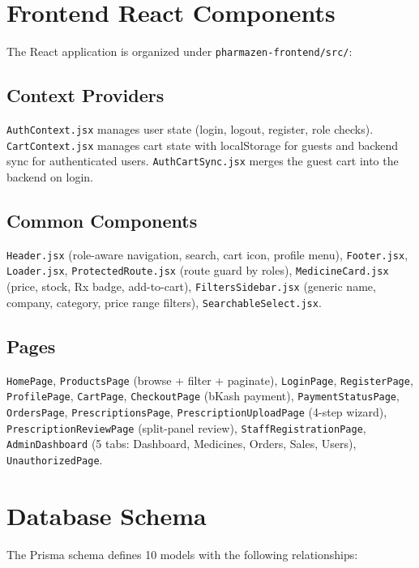 \documentclass[12pt,a4paper]{article}
\begin{document}
\section{Frontend React Components}
The React application is organized under \texttt{pharmazen-frontend/src/}:

\subsection{Context Providers}
\texttt{AuthContext.jsx} manages user state (login, logout, register, role checks). \texttt{CartContext.jsx} manages cart state with localStorage for guests and backend sync for authenticated users. \texttt{AuthCartSync.jsx} merges the guest cart into the backend on login.

\subsection{Common Components}
\texttt{Header.jsx} (role-aware navigation, search, cart icon, profile menu), \texttt{Footer.jsx}, \texttt{Loader.jsx}, \texttt{ProtectedRoute.jsx} (route guard by roles), \texttt{MedicineCard.jsx} (price, stock, Rx badge, add-to-cart), \texttt{FiltersSidebar.jsx} (generic name, company, category, price range filters), \texttt{SearchableSelect.jsx}.

\subsection{Pages}
\texttt{HomePage}, \texttt{ProductsPage} (browse + filter + paginate), \texttt{LoginPage}, \texttt{RegisterPage}, \texttt{ProfilePage}, \texttt{CartPage}, \texttt{CheckoutPage} (bKash payment), \texttt{PaymentStatusPage}, \texttt{OrdersPage}, \texttt{PrescriptionsPage}, \texttt{PrescriptionUploadPage} (4-step wizard), \texttt{PrescriptionReviewPage} (split-panel review), \texttt{StaffRegistrationPage}, \texttt{AdminDashboard} (5 tabs: Dashboard, Medicines, Orders, Sales, Users), \texttt{UnauthorizedPage}.

\section{Database Schema}
The Prisma schema defines 10 models with the following relationships:
\end{document}
